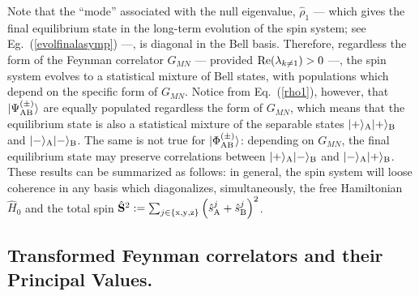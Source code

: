\documentclass[]{nature}
\begin{document}
{Note that the
``mode''  associated with the null eigenvalue,  $ \hat \rho_1$  --- which gives the final equilibrium state 
in the long-term evolution of the spin system; see Eg.~(\ref{evolfinalasymp}) ---, is diagonal in the Bell basis.
Therefore, regardless the form of the Feynman correlator $G_{MN}$ --- 
provided ${\rm Re}(\lambda_{k\neq1})>0$
---, the spin system evolves to a statistical mixture of Bell states, with populations which depend on the specific
form of $G_{MN}$.
Notice from Eq.~(\ref{rho1}), however, that 
$|\Psi_{\rm AB}^{(\pm)}\rangle$ are equally populated regardless the form of $G_{MN}$, which means that the equilibrium state is also 
a statistical mixture of the separable states $|+ \rangle_{\rm A} |+\rangle_{\rm B}$ and  $|- \rangle_{\rm A} |-\rangle_{\rm B}$. The same is not true for 
$|\Phi_{\rm AB}^{(\pm)}\rangle$: depending on $G_{MN}$, the final equilibrium state may preserve correlations between
$|+ \rangle_{\rm A} |-\rangle_{\rm B}$ and  $|- \rangle_{\rm A} |+\rangle_{\rm B}$. These results can be summarized as follows: 
in general, the spin system  will loose coherence in any basis which diagonalizes,
simultaneously, the free Hamiltonian $\hat H_0$ and the
 total spin $\hat {\bf S}^2 := \sum_{j\in\{{\rm x},{\rm y},{\rm z}\}}\left(\hat s_{\rm A}^j+\hat s_{\rm B}^j\right)^2$.

\subsection{Transformed Feynman correlators and their Principal Values.}

}
\end{document}
